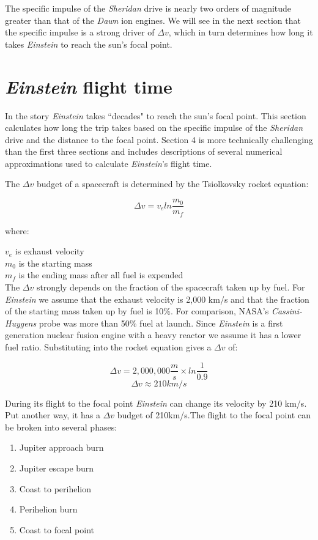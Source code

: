 \documentclass[12pt]{article} %
\begin{document}
The specific impulse of the \textit{Sheridan} drive is nearly two orders of magnitude greater than that of the \textit{Dawn} ion engines. We will see in the next section that the specific impulse is a strong driver of $\Delta v$, which in turn determines how long it takes \textit{Einstein} to reach the sun's focal point.

\section{\textit{Einstein} flight time}
In the story \textit{Einstein} takes ``decades" to reach the sun's focal point. This section calculates how long the trip takes based on the specific impulse of the \textit{Sheridan} drive and the distance to the focal point. Section 4 is more technically challenging than the first three sections and includes descriptions of several numerical approximations used to calculate \textit{Einstein}'s flight time.

The $\Delta v$ budget of a spacecraft is determined by the Tsiolkovsky rocket equation:

$$\Delta v = v_e ln \frac{m_0}{m_f}$$

where:

$v_e$ is exhaust velocity\\
$m_0$ is the starting mass\\
$m_f$ is the ending mass after all fuel is expended\\

The $\Delta v$ strongly depends on the fraction of the spacecraft taken up by fuel. For \textit{Einstein} we assume that the exhaust velocity is 2,000 km/s and that the fraction of the starting mass taken up by fuel is 10\%. For comparison, NASA's \textit{Cassini-Huygens} probe was more than 50\% fuel at launch. Since \textit{Einstein} is a first generation nuclear fusion engine with a heavy reactor we assume it has a lower fuel ratio. Substituting into the rocket equation gives a $\Delta v$ of:

$$\Delta v = 2,000,000\frac{m}{s} \times ln \frac{1}{0.9}$$
$$\Delta v \approx 210 km/s$$ 

During its flight to the focal point \textit{Einstein} can change its velocity by 210 km/s. Put another way, it has a $\Delta v$ budget of 210km/s.The flight to the focal point can be broken into several phases:
\begin{enumerate}
\item Jupiter approach burn
\item Jupiter escape burn
\item Coast to perihelion
\item Perihelion burn
\item Coast to focal point
\end{enumerate}
\end{document}
